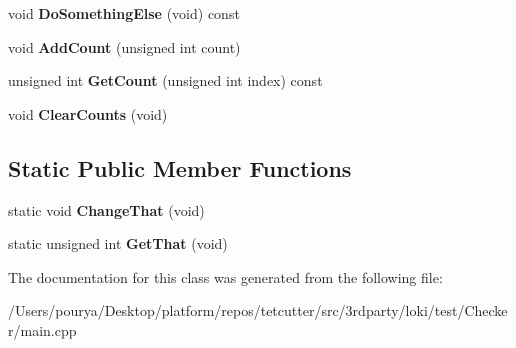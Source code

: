 \begin{DoxyCompactItemize}
\item 
\hypertarget{classThingy_a59a273d220c1bfc93cb70bfe04756050}{}void {\bfseries Do\+Something\+Else} (void) const \label{classThingy_a59a273d220c1bfc93cb70bfe04756050}

\item 
\hypertarget{classThingy_a203dc1fbe7cf6f853f86006c59e640a5}{}void {\bfseries Add\+Count} (unsigned int count)\label{classThingy_a203dc1fbe7cf6f853f86006c59e640a5}

\item 
\hypertarget{classThingy_a687d71c2da9a6f1a78785bc8a144b28a}{}unsigned int {\bfseries Get\+Count} (unsigned int index) const \label{classThingy_a687d71c2da9a6f1a78785bc8a144b28a}

\item 
\hypertarget{classThingy_acca118df1ec6f92c769983473acbffb4}{}void {\bfseries Clear\+Counts} (void)\label{classThingy_acca118df1ec6f92c769983473acbffb4}

\end{DoxyCompactItemize}
\subsection*{Static Public Member Functions}
\begin{DoxyCompactItemize}
\item 
\hypertarget{classThingy_a80d5b21a497c71ad32f99643784abee1}{}static void {\bfseries Change\+That} (void)\label{classThingy_a80d5b21a497c71ad32f99643784abee1}

\item 
\hypertarget{classThingy_ab6a253b06ff16b212ee613a8116bea85}{}static unsigned int {\bfseries Get\+That} (void)\label{classThingy_ab6a253b06ff16b212ee613a8116bea85}

\end{DoxyCompactItemize}


The documentation for this class was generated from the following file\+:\begin{DoxyCompactItemize}
\item 
/\+Users/pourya/\+Desktop/platform/repos/tetcutter/src/3rdparty/loki/test/\+Checker/main.\+cpp\end{DoxyCompactItemize}
